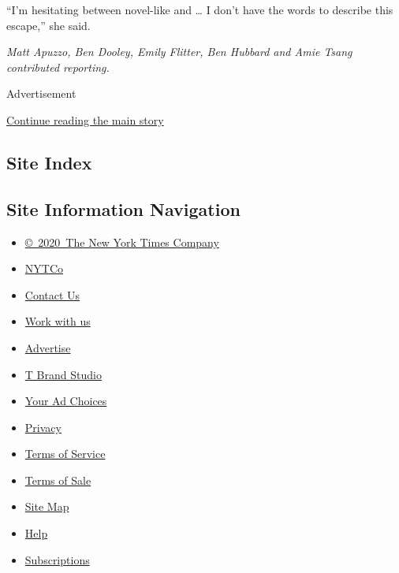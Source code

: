 ``I'm hesitating between novel-like and \ldots{} I don't have the words
to describe this escape,'' she said.

\emph{Matt Apuzzo, Ben Dooley, Emily Flitter, Ben Hubbard and Amie Tsang
contributed reporting.}

Advertisement

\protect\hyperlink{after-bottom}{Continue reading the main story}

\hypertarget{site-index}{%
\subsection{Site Index}\label{site-index}}

\hypertarget{site-information-navigation}{%
\subsection{Site Information
Navigation}\label{site-information-navigation}}

\begin{itemize}
\tightlist
\item
  \href{https://help.nytimes.com/hc/en-us/articles/115014792127-Copyright-notice}{©~2020~The
  New York Times Company}
\end{itemize}

\begin{itemize}
\tightlist
\item
  \href{https://www.nytco.com/}{NYTCo}
\item
  \href{https://help.nytimes.com/hc/en-us/articles/115015385887-Contact-Us}{Contact
  Us}
\item
  \href{https://www.nytco.com/careers/}{Work with us}
\item
  \href{https://nytmediakit.com/}{Advertise}
\item
  \href{http://www.tbrandstudio.com/}{T Brand Studio}
\item
  \href{https://www.nytimes.com/privacy/cookie-policy\#how-do-i-manage-trackers}{Your
  Ad Choices}
\item
  \href{https://www.nytimes.com/privacy}{Privacy}
\item
  \href{https://help.nytimes.com/hc/en-us/articles/115014893428-Terms-of-service}{Terms
  of Service}
\item
  \href{https://help.nytimes.com/hc/en-us/articles/115014893968-Terms-of-sale}{Terms
  of Sale}
\item
  \href{https://spiderbites.nytimes.com}{Site Map}
\item
  \href{https://help.nytimes.com/hc/en-us}{Help}
\item
  \href{https://www.nytimes.com/subscription?campaignId=37WXW}{Subscriptions}
\end{itemize}

